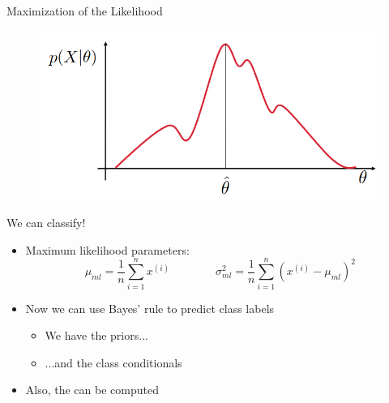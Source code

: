 \begin{frame}{Maximization of the Likelihood}{}
	\begin{figure}
		\centering
		\includegraphics[scale=0.55]{04_density_estimation/02_img/maximum_likelihood}
	\end{figure}
\end{frame}


\begin{frame}{We can classify!}{}\important
	\begin{itemize}
		\item Maximum likelihood parameters:
		\begin{equation*}
			\mu_{ml} =  \frac{1}{n} \sum_{i=1}^n x^{(i)}
			\qquad\qquad
			\sigma_{ml}^2 = \frac{1}{n} \sum_{i=1}^n (x^{(i)} - \mu_{ml})^2
		\end{equation*}
		\item Now we can use Bayes' rule to predict class labels
		\begin{itemize}
			\item We have the priors...
			\item ...and the class conditionals
		\end{itemize}
		\item Also, the  can be computed
	\end{itemize}
\end{frame}


